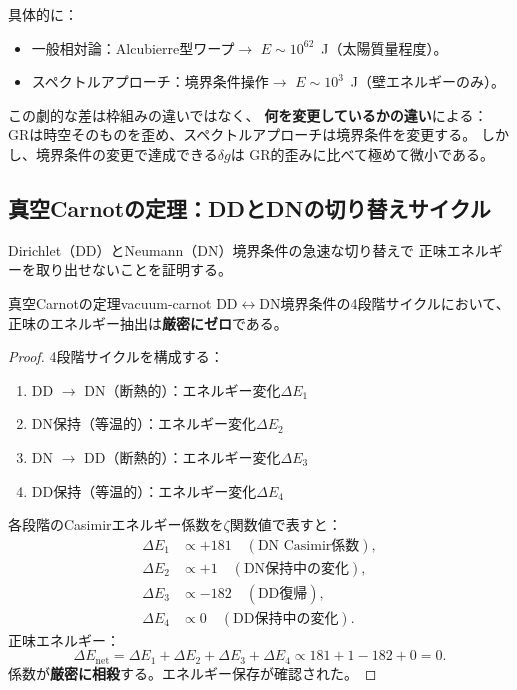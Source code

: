 \documentclass[11pt,a4paper]{article}
\begin{document}
\noindent
具体的に：
\begin{itemize}
\item 一般相対論：Alcubierre型ワープ$\to$ $E \sim 10^{62}$~J（太陽質量程度）。
\item スペクトルアプローチ：境界条件操作$\to$ $E \sim 10^3$~J（壁エネルギーのみ）。
\end{itemize}
この劇的な差は枠組みの違いではなく、
\textbf{何を変更しているかの違い}による：
GRは時空そのものを歪め、スペクトルアプローチは境界条件を変更する。
しかし、境界条件の変更で達成できる$\delta g$は
GR的歪みに比べて極めて微小である。


\subsection{真空Carnotの定理：DDとDNの切り替えサイクル}
\label{sec:14.2}

Dirichlet（DD）とNeumann（DN）境界条件の急速な切り替えで
正味エネルギーを取り出せないことを証明する。

\begin{keytheorem}{真空Carnotの定理}{vacuum-carnot}
DD$\leftrightarrow$DN境界条件の4段階サイクルにおいて、
正味のエネルギー抽出は\textbf{厳密にゼロ}である。
\end{keytheorem}

\begin{proof}
4段階サイクルを構成する：
\begin{enumerate}
\item DD $\to$ DN（断熱的）：エネルギー変化$\Delta E_1$
\item DN保持（等温的）：エネルギー変化$\Delta E_2$
\item DN $\to$ DD（断熱的）：エネルギー変化$\Delta E_3$
\item DD保持（等温的）：エネルギー変化$\Delta E_4$
\end{enumerate}
各段階のCasimirエネルギー係数を$\zeta$関数値で表すと：
\begin{align}
\Delta E_1 &\propto +181 \quad (\text{DN Casimir係数}), \\
\Delta E_2 &\propto +1 \quad (\text{DN保持中の変化}), \\
\Delta E_3 &\propto -182 \quad (\text{DD復帰}), \\
\Delta E_4 &\propto 0 \quad (\text{DD保持中の変化}).
\end{align}
正味エネルギー：
\[
\Delta E_{\text{net}} = \Delta E_1 + \Delta E_2 + \Delta E_3 + \Delta E_4
\propto 181 + 1 - 182 + 0 = 0.
\]
係数が\textbf{厳密に相殺}する。エネルギー保存が確認された。\qedhere
\end{proof}
\end{document}
